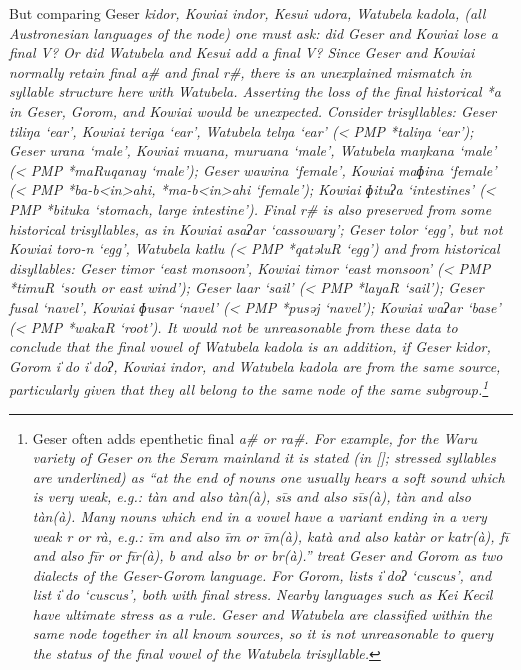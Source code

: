 But comparing Geser \it{kidor},
Kowiai \it{indor}, Kesui \it{udora},
Watubela \it{kadola}, (all Austronesian 
languages of the  node) one must ask: did
Geser and Kowiai lose a final V? Or did Watubela
and Kesui add a final V? Since Geser
and Kowiai normally retain final a{\#}
and final r{\#}, there is an unexplained mismatch in syllable
structure here with Watubela.
Asserting the loss of the final historical *a in Geser,
Gorom, and Kowiai would be unexpected.
Consider trisyllables: Geser \it{tiliŋa} ‘ear’,
Kowiai \it{teriga} ‘ear’, Watubela \it{telŋa} ‘ear’ (< PMP *taliŋa
‘ear’); Geser \it{urana} ‘male’,
Kowiai \it{muana, muruana} ‘male’,
Watubela \it{maŋkana} ‘male’ (< PMP *maRuqanay ‘male’); Geser
\it{wawina} ‘female’, Kowiai \it{maɸina} ‘female’ (< PMP *ba-b<in>ahi,
*ma-b<in>ahi ‘female’); Kowiai \it{ɸituʔa} ‘intestines’ (< PMP
*bituka ‘stomach, large intestine’).
Final r{\#} is also preserved from some historical trisyllables,
as in Kowiai \it{asaʔar} ‘cassowary’; Geser \it{tolor} ‘egg’,
but not Kowiai \it{toro-n} ‘egg’,
Watubela \it{katlu} (< PMP *qatəluR ‘egg’)
and from historical disyllables: Geser \it{timor} ‘east monsoon’,
Kowiai \it{timor} ‘east monsoon’ (< PMP *timuR ‘south or east
wind’); Geser \it{laar} ‘sail’ (< PMP *layaR ‘sail’); Geser \it{fusal}
‘navel’, Kowiai \it{ɸusar} ‘navel’ (< PMP *pusəj ‘navel’); Kowiai \it{waʔar}
‘base’ (< PMP *wakaR ‘root’).
It would not be unreasonable from these data to conclude that
the final vowel of Watubela \it{kadola} is an addition,
if Geser \it{kidor}, Gorom \it{iˈdo {\tl} iˈdoʔ},
Kowiai \it{indor}, and Watubela \it{kadola} are from the same
source, particularly given that they all belong to the same node of the
same subgroup.\footnote{
		Geser often adds epenthetic final \it{a{\#}} or \it{ra{\#}}.
		For example, for the Waru variety of Geser on the Seram mainland
		it is stated (in \citeauthor{Stokhof1982a} [\citeyear[55]{Stokhof1982a}];
		stressed syllables are underlined)
		as “at the end of nouns one usually hears a soft  sound which
		is very weak, e.g.: tàn and also tàn(à), sīs
		and also sīs(à), tàn and also tàn(à).
		Many nouns which end in a vowel have a variant ending in a very
		weak r or rà,
		e.g.: īm and also īm or īm(à),
		katà and also katàr or katr(à),
		fī and also fīr or fīr(à),
		b and also br or br(à).” \citet{LoskiLoski1989} treat Geser
		and Gorom as two dialects of the Geser-Gorom language.
		For Gorom, \citet{Visser2019a} lists \it{iˈdoʔ} ‘cuscus’,
		and \citet[51]{Kakerissa1986} list \it{iˈdo} ‘cuscus’,
		both with final stress.
		Nearby languages such as Kei Kecil have ultimate stress as a rule.
		Geser and Watubela are classified within the same node together
		in all known sources,
		so it is not unreasonable to query the status of the final vowel
		of the Watubela trisyllable.}

